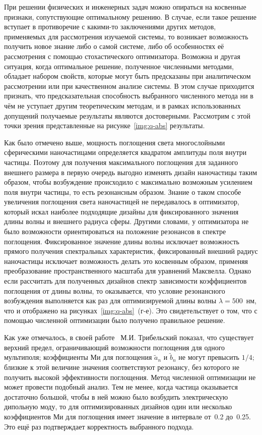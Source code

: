 При решении физических и инженерных задач можно опираться на косвенные
признаки, сопутствующие оптимальному решению.  В случае, если такое
решение вступает в противоречие с какими-то заключениями других
методов, применяемых для рассмотрения изучаемой системы, то возникает
возможность получить новое знание либо о самой системе, либо об
особенностях её рассмотрения с помощью стохастического
оптимизатора. Возможна и другая ситуация, когда оптимальное решение,
полученное численными методами, обладает набором свойств, которые
могут быть предсказаны при аналитическом рассмотрении или при
качественном анализе системы. В этом случае приходится признать, что
предсказательная способность выбранного численного метода ни в чём не
уступает другим теоретическим методам, и в рамках использованных
допущений получаемые результаты являются достоверными. Рассмотрим с
этой точки зрения представленные на рисунке~\ref{img:q-abs}
результаты.

Как было отмечено выше, мощность поглощения света многослойными
сферическими наночастицами определяется квадратом амплитуды поля
внутри частицы.  Поэтому для получения максимального поглощения для
заданного внешнего размера в первую очередь выгодно изменять дизайн
наночастицы таким образом, чтобы возбуждение происходило с максимально
возможным усилением поля внутри частицы, то есть резонансным образом.
Знание о таком способе увеличения поглощения света наночастицей не
передавалось в оптимизатор, который искал наиболее подходящие дизайны
для фиксированного значения длины волны и внешнего радиуса сферы.
Другими словами, у оптимизатора не было возможности ориентироваться на
положение резонансов в спектре поглощения. Фиксированное значение длины
волны исключает возможность прямого получения спектральных
характеристик, фиксированный внешний радиус наночастицы исключает
возможность делать это косвенным образом, применяя преобразование
пространственного масштаба для уравнений Максвелла. Однако если
рассчитать для полученных дизайнов спектр зависимости коэффициентов
поглощения от длины волны, то оказывается, что условие резонансного
возбуждения выполняется как раз для оптимизируемой длины волны
$\lambda=500$~нм, что и отображено на рисунках~\ref{img:q-abs}~(г-е).  Это
свидетельствует о том, что с помощью численной оптимизации было
получено правильное решение.

Как уже отмечалось, в своей работе~\cite{Tribelsky-2011}
М.И. Трибельский показал, что существует верхний предел, ограничивающий
возможности поглощения для одного мультиполя; коэффициенты Ми для
поглощения $\tilde{a}_n$ и $\tilde{b}_n$ не могут превысить $1/4$;
близкие к этой величине значения соответствуют резонансу, без которого
не получить высокой эффективности поглощения.  Метод численной
оптимизации не может провести подобный анализ.  Тем не менее, когда
частица оказывается достаточно большой, чтобы в ней можно было
возбудить электрическую дипольную моду, то для оптимизированных
дизайнов один или несколько коэффициентов Ми для поглощения имеет
значение в интервале от~0.2 до~0.25.  Это ещё раз подтверждает
корректность выбранного подхода.

